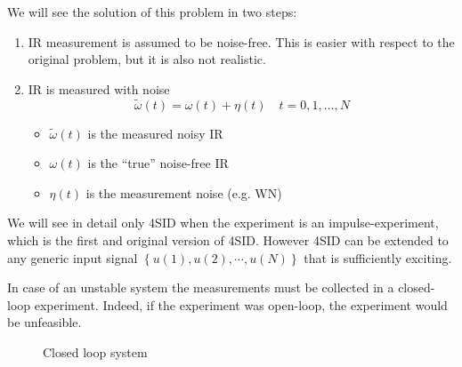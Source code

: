 We will see the solution of this problem in two steps:
\begin{enumerate}
    \item IR measurement is assumed to be noise-free.
    This is easier with respect to the original problem, but it is also not realistic.
    \item IR is measured with noise
    \[ \widetilde{\omega}(t) = \omega(t) + \eta(t) \quad t = 0, 1,\dots, N \]
    \begin{itemize}
        \item $\widetilde{\omega}(t)$ is the measured noisy IR
        \item $\omega(t)$ is the ``true'' noise-free IR
        \item $\eta(t)$ is the measurement noise (e.g. WN)
    \end{itemize}
\end{enumerate}
\begin{rem}
    We will see in detail only 4SID when the experiment is an impulse-experiment, which is the first and original version of 4SID.
    However 4SID can be extended to any generic input signal $\left\{ u(1), u(2), \cdots, u(N) \right\}$ that is sufficiently exciting.
\end{rem}
\begin{rem}
    In case of an unstable system the measurements must be collected in a closed-loop experiment.
    Indeed, if the experiment was open-loop, the experiment would be unfeasible.

    \begin{figure}[H]
        \centering
        \caption*{Closed loop system}
    \end{figure}
\end{rem}
